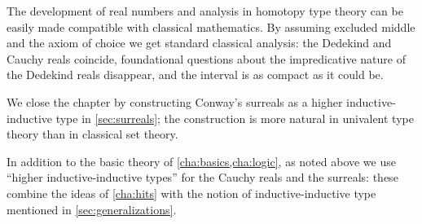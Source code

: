 The development of real numbers and analysis in homotopy type theory can be easily made compatible with classical mathematics. By assuming excluded middle and the axiom of choice we get standard classical analysis: the Dedekind and Cauchy reals coincide, foundational questions about the impredicative nature of the Dedekind reals disappear, and the interval is as compact as it could be.

We close the chapter by constructing Conway's surreals as a higher inductive-inductive type in \cref{sec:surreals};
the construction is more natural in univalent type theory than in  classical set theory.

In addition to the basic theory of \cref{cha:basics,cha:logic}, as noted above we use ``higher inductive-inductive types'' for the Cauchy reals and the surreals: these combine the ideas of \cref{cha:hits} with the notion of inductive-inductive type mentioned in \cref{sec:generalizations}.

